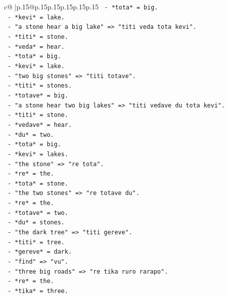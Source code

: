 \documentclass{article}
\begin{document}
{\begin{supertabular}{c@{$\;$}|p{.15\linewidth}@{}p{.15\linewidth}p{.15\linewidth}p{.15\linewidth}p{.15\linewidth}p{.15\linewidth}}
{{{\texttt{            {-} *tota* = big.} \\
\texttt{            {-} *kevi* = lake.} \\
\texttt{          {-} "a stone hear a big lake" => "titi veda tota kevi".} \\
\texttt{            {-} *titi* = stone.} \\
\texttt{            {-} *veda* = hear.} \\
\texttt{            {-} *tota* = big.} \\
\texttt{            {-} *kevi* = lake.} \\
\texttt{          {-} "two big stones" => "titi totave".} \\
\texttt{            {-} *titi* = stones.} \\
\texttt{            {-} *totave* = big.} \\
\texttt{          {-} "a stone hear two big lakes" => "titi vedave du tota kevi".} \\
\texttt{            {-} *titi* = stone.} \\
\texttt{            {-} *vedave* = hear.} \\
\texttt{            {-} *du* = two.} \\
\texttt{            {-} *tota* = big.} \\
\texttt{            {-} *kevi* = lakes.} \\
\texttt{          {-} "the stone" => "re tota".} \\
\texttt{            {-} *re* = the.} \\
\texttt{            {-} *tota* = stone.} \\
\texttt{          {-} "the two stones" => "re totave du".} \\
\texttt{            {-} *re* = the.} \\
\texttt{            {-} *totave* = two.} \\
\texttt{            {-} *du* = stones.} \\
\texttt{          {-} "the dark tree" => "titi gereve".} \\
\texttt{            {-} *titi* = tree.} \\
\texttt{            {-} *gereve* = dark.} \\
\texttt{          {-} "find" => "vu".} \\
\texttt{          {-} "three big roads" => "re tika ruro rarapo".} \\
\texttt{            {-} *re* = the.} \\
\texttt{            {-} *tika* = three.} \\
}}}
\end{supertabular}}
\end{document}
